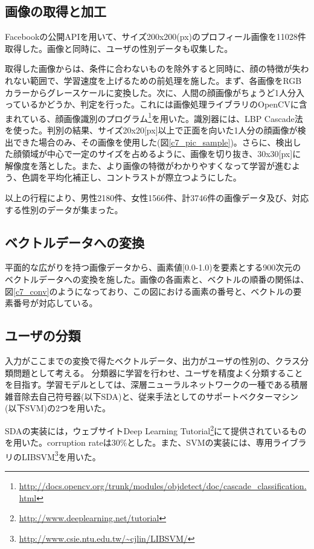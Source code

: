 \subsection{画像の取得と加工}
Facebookの公開APIを用いて、サイズ200x200(px)のプロフィール画像を11028件取得した。画像と同時に、ユーザの性別データも収集した。\par
取得した画像からは、条件に合わないものを除外すると同時に、顔の特徴が失われない範囲で、学習速度を上げるための前処理を施した。まず、各画像をRGBカラーからグレースケールに変換した。次に、人間の顔画像がちょうど1人分入っているかどうか、判定を行った。これには画像処理ライブラリのOpenCVに含まれている、顔画像識別のプログラム\footnote{\url{http://docs.opencv.org/trunk/modules/objdetect/doc/cascade_classification.html}}を用いた。識別器には、LBP Cascade法\cite{liao2007learning}を使った。判別の結果、サイズ20x20[px]以上で正面を向いた1人分の顔画像が検出できた場合のみ、その画像を使用した(図\ref{c7_pic_sample})。さらに、検出した顔領域が中心で一定のサイズを占めるように、画像を切り抜き、30x30[px]に解像度を落とした。また、より画像の特徴がわかりやすくなって学習が進むよう、色調を平均化補正し、コントラストが際立つようにした。\par
以上の行程により、男性2180件、女性1566件、計3746件の画像データ及び、対応する性別のデータが集まった。
\subsection{ベクトルデータへの変換}
平面的な広がりを持つ画像データから、画素値[0.0-1.0)を要素とする900次元のベクトルデータへの変換を施した。画像の各画素と、ベクトルの順番の関係は、図\ref{c7_conv}のようになっており、この図における画素の番号と、ベクトルの要素番号が対応している。
\subsection{ユーザの分類}
入力がここまでの変換で得たベクトルデータ、出力がユーザの性別の、クラス分類問題として考える。
分類器に学習を行わせ、ユーザを精度よく分類することを目指す。学習モデルとしては、深層ニューラルネットワークの一種である積層雑音除去自己符号器(以下SDA)と、従来手法としてのサポートベクターマシン(以下SVM)の2つを用いた。\par
SDAの実装には，ウェブサイトDeep Learning Tutorial\footnote{\url{http://www.deeplearning.net/tutorial}}にて提供されているものを用いた。corruption rateは30\%とした。また、SVMの実装には、専用ライブラリのLIBSVM\footnote{\url{http://www.csie.ntu.edu.tw/~cjlin/LIBSVM/}}を用いた。
\par

